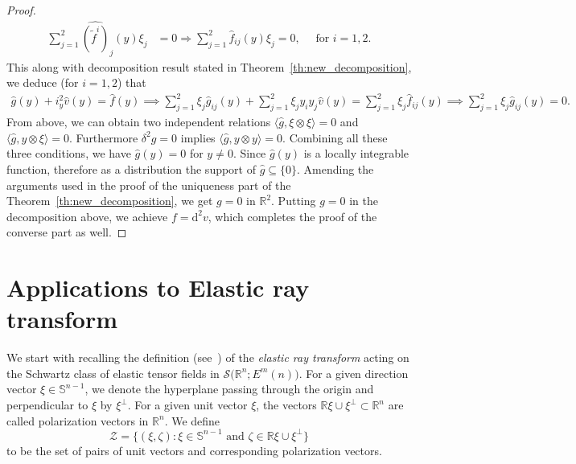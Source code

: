 \documentclass[11pt]{article}
\newcommand{\Rb}{\mathbb{R}}
\newcommand{\Sb}{\mathbb{S}}
\renewcommand{\d}{\mathrm{d}}
\begin{document}
\begin{proof}
\begin{align*}
     \sum_{j=1}^2\widehat{(\tilde{f}^i)}_{j}(y)\xi_j &= 0 \Longrightarrow   \sum_{j=1}^2\widehat{f}_{ij}(y) \xi_j = 0, \quad \mbox{ for } i = 1, 2. 
\end{align*}
This along with decomposition result stated in Theorem~\ref{th:new_decomposition}, we deduce (for $i=1, 2$) that 
\begin{align*}
     \widehat{g}(y) + i_y^2 \widehat{v}(y)  = \widehat{f}(y)
  \implies   \sum_{j=1}^2\xi_j\widehat{g}_{ij}(y) +  \sum_{j=1}^2\xi_j y_iy_j \widehat{v}(y)  =   \sum_{j=1}^2\xi_j \widehat{f}_{ij}(y) \implies  \sum_{j=1}^2\xi_j\widehat{g}_{ij}(y)  = 0. %
\end{align*}
From above, we can obtain two independent relations $\langle 
\widehat{g}, \xi\otimes \xi\rangle = 0$ and $\langle 
\widehat{g}, y \otimes \xi\rangle = 0$. Furthermore $\delta^2 g = 0$ implies  $\langle 
\widehat{g}, y\otimes y \rangle = 0$. Combining all these three conditions, we have $\widehat{g}(y)= 0$ for $y \neq 0$. Since $ \widehat{g}(y) $ is a locally integrable function, therefore as a distribution the support of $ \widehat{g}\subseteq \{0\}$. Amending the arguments used in the proof of the uniqueness part of the Theorem~\ref{th:new_decomposition}, we get $g=0 $ in $ \Rb^2$. Putting $g=0$ in the decomposition above, we achieve $f =\d^{2}v$, which completes the proof of the converse part as well.
\end{proof}

\section{Applications to Elastic ray transform}
\label{sec:Application to elastic ray}

We start with recalling the definition (see~\cite{ilmavirta2025elasticraytransform}) of the \emph{elastic ray transform} acting on the Schwartz class of elastic tensor fields in $\mathcal{S}(\mathbb{R}^n;{E^m(n))}$. For a given direction vector $\xi \in \mathbb{S}^{n-1}$, we denote the hyperplane passing through the origin and perpendicular to $\xi$ by $\xi^\perp$. For a given unit vector $\xi$, the vectors $ \Rb \xi \cup \xi^{\perp} \subset \Rb^n$ are called polarization vectors in $\mathbb{R}^n$. We define
\begin{equation*}
\mathcal{Z}
=
\{(\xi, \zeta): \xi\in \Sb^{n-1} \mbox{ and } \zeta \in \Rb \xi \cup \xi^{\perp}\}
\end{equation*}
to be the set of pairs of unit vectors and corresponding polarization vectors.
\end{document}
